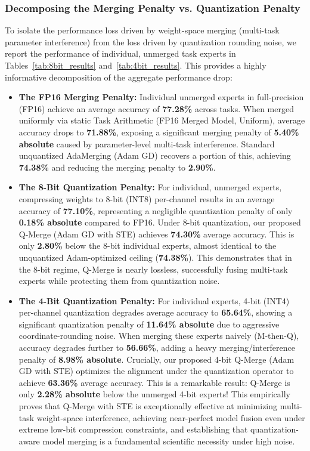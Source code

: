 \subsubsection{Decomposing the Merging Penalty vs. Quantization Penalty}
To isolate the performance loss driven by weight-space merging (multi-task parameter interference) from the loss driven by quantization rounding noise, we report the performance of individual, unmerged task experts in Tables~\ref{tab:8bit_results} and~\ref{tab:4bit_results}. This provides a highly informative decomposition of the aggregate performance drop:
\begin{itemize}
    \item \textbf{The FP16 Merging Penalty:} Individual unmerged experts in full-precision (FP16) achieve an average accuracy of \textbf{77.28\%} across tasks. When merged uniformly via static Task Arithmetic (FP16 Merged Model, Uniform), average accuracy drops to \textbf{71.88\%}, exposing a significant merging penalty of \textbf{5.40\% absolute} caused by parameter-level multi-task interference. Standard unquantized AdaMerging (Adam GD) recovers a portion of this, achieving \textbf{74.38\%} and reducing the merging penalty to \textbf{2.90\%}.
    \item \textbf{The 8-Bit Quantization Penalty:} For individual, unmerged experts, compressing weights to 8-bit (INT8) per-channel results in an average accuracy of \textbf{77.10\%}, representing a negligible quantization penalty of only \textbf{0.18\% absolute} compared to FP16. Under 8-bit quantization, our proposed Q-Merge (Adam GD with STE) achieves \textbf{74.30\%} average accuracy. This is only \textbf{2.80\%} below the 8-bit individual experts, almost identical to the unquantized Adam-optimized ceiling (\textbf{74.38\%}). This demonstrates that in the 8-bit regime, Q-Merge is nearly lossless, successfully fusing multi-task experts while protecting them from quantization noise.
    \item \textbf{The 4-Bit Quantization Penalty:} For individual experts, 4-bit (INT4) per-channel quantization degrades average accuracy to \textbf{65.64\%}, showing a significant quantization penalty of \textbf{11.64\% absolute} due to aggressive coordinate-rounding noise. When merging these experts naively (M-then-Q), accuracy degrades further to \textbf{56.66\%}, adding a heavy merging/interference penalty of \textbf{8.98\% absolute}. 
    Crucially, our proposed 4-bit Q-Merge (Adam GD with STE) optimizes the alignment under the quantization operator to achieve \textbf{63.36\%} average accuracy. This is a remarkable result: Q-Merge is only \textbf{2.28\% absolute} below the unmerged 4-bit experts! This empirically proves that Q-Merge with STE is exceptionally effective at minimizing multi-task weight-space interference, achieving near-perfect model fusion even under extreme low-bit compression constraints, and establishing that quantization-aware model merging is a fundamental scientific necessity under high noise.
\end{itemize}

